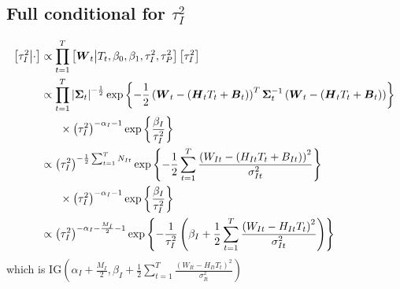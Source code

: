 \documentclass{article}\usepackage[]{graphicx}\usepackage[]{color}
\def\bm#1{\mbox{\boldmath $#1$}}
\begin{document}
\subsection{Full conditional for $\tau^2_I$}
%
\begin{align*}
%
\left[ \tau^2_I \middle| \cdot \right] & \propto \prod_{t = 1}^T \left[ \bm{W}_t \middle| T_t, \beta_0, \beta_1, \tau^2_I, \tau^2_P \right] \left[ \tau^2_I \right] \\
%
& \propto \prod_{t = 1}^T \left| \bm{\Sigma}_t \right|^{ - \frac{1} {2}} \exp{ \left\{ - \frac{1} {2} \left( \bm{W}_t - \left( \bm{H}_t T_t + \bm{B}_t \right) \right)^T \bm{\Sigma}_t^{ - 1} \left( \bm{W}_t - \left( \bm{H}_t T_t + \bm{B}_t \right) \right) \right\} }\\
& \hspace{6mm} \times \left( \tau^2_I \right)^{ - \alpha_I - 1 } \exp{ \left\{ \frac{\beta_I} {\tau^2_I} \right\} }\\
%
& \propto \left( \tau^2_I \right)^{ - \frac{1} {2} \sum_{t = 1}^T N_{It}} \exp{ \left\{ - \frac{1} {2} \sum_{t = 1}^T \frac{\left( W_{It} - \left( H_{It} T_t + B_{It} \right) \right)^2} {\sigma^2_{It}} \right\} }\\
& \hspace{6mm} \times \left( \tau^2_I \right)^{ - \alpha_I - 1 } \exp{ \left\{ \frac{\beta_I} {\tau^2_I} \right\} }\\
%
& \propto \left( \tau^2_I \right)^{ - \alpha_I - \frac{M_I} {2} - 1 } \exp{ \left\{ - \frac{1} {\tau^2_I} \left( \beta_I + \frac{1} {2} \sum_{t = 1}^T \frac{\left( W_{It} - H_{It} T_t \right)^2} {\sigma^2_{It}} \right) \right\} }\\
%
\end{align*}
%
which is IG$\left( \alpha_I + \frac{M_I} {2}, \beta_I + \frac{1} {2} \sum_{t = 1}^T \frac{\left( W_{It} - H_{It} T_t \right)^2} {\sigma^2_{It}} \right)$
%
%
\end{document}
